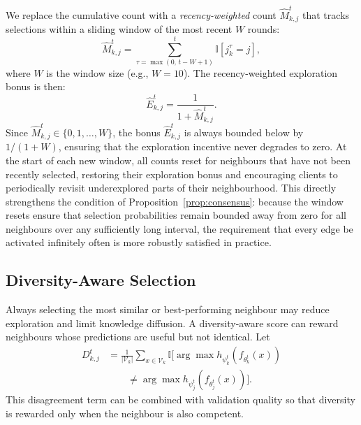 \documentclass[conference]{IEEEtran}
\begin{document}
We replace the cumulative count with a \emph{recency-weighted} count \(\hat{M}_{k,j}^t\) that tracks selections within a sliding window of the most recent \(W\) rounds:
\begin{equation}
    \hat{M}_{k,j}^t
    =
    \sum_{\tau = \max(0,\, t-W+1)}^{t}
    \mathbb{I}\left[j_k^\tau = j\right],
    \label{eq:recency_count}
\end{equation}
where \(W\) is the window size (e.g., \(W = 10\)). The recency-weighted exploration bonus is then:
\begin{equation}
    \hat{E}_{k,j}^t
    =
    \frac{1}{1 + \hat{M}_{k,j}^t}.
    \label{eq:recency_exploration}
\end{equation}
Since \(\hat{M}_{k,j}^t \in \{0, 1, \dots, W\}\), the bonus \(\hat{E}_{k,j}^t\) is always bounded below by \(1/(1+W)\), ensuring that the exploration incentive never degrades to zero. At the start of each new window, all counts reset for neighbours that have not been recently selected, restoring their exploration bonus and encouraging clients to periodically revisit underexplored parts of their neighbourhood. This directly strengthens the condition of Proposition~\ref{prop:consensus}: because the window resets ensure that selection probabilities remain bounded away from zero for all neighbours over any sufficiently long interval, the requirement that every edge be activated infinitely often is more robustly satisfied in practice.

\subsection{Diversity-Aware Selection}
\label{subsec:diversity-aware-selection}
Always selecting the most similar or best-performing neighbour may reduce exploration and limit knowledge diffusion. A diversity-aware score can reward neighbours whose predictions are useful but not identical. Let
\begin{equation}
\begin{aligned}
D_{k,j}^{t}
&=\frac{1}{|\mathcal{V}_k|}
\sum_{x\in\mathcal{V}_k}
\mathbb{I}\Big[
\arg\max h_{\psi_k^t}(f_{\theta_k^t}(x))\\
&\qquad\neq
\arg\max h_{\psi_j^t}(f_{\theta_j^t}(x))
\Big].
\end{aligned}
\label{eq:diversity_disagreement}
\end{equation}
This disagreement term can be combined with validation quality so that diversity is rewarded only when the neighbour is also competent.
\end{document}
